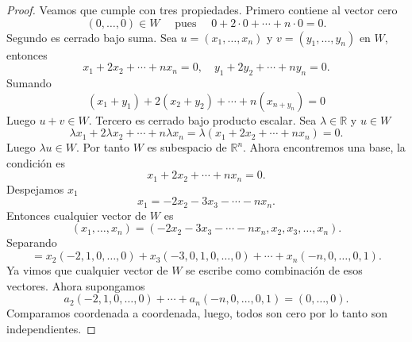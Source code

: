\documentclass[12pt,a4paper]{article}
\begin{document}
    \begin{proof}
        Veamos que cumple con tres propiedades. Primero contiene al vector cero
        \begin{equation*}
            (0,\dots,0)\in W\quad\text{ pues }\quad0+2\cdot0+\cdots+n\cdot0=0.
        \end{equation*}
        Segundo es cerrado bajo suma. Sea $u=(x_{1},\dots,x_{n})$ y $v=(y_{1},\dots,y_{n})$
        en $W$, entonces
        \begin{equation*}
            x_{1}+2x_{2}+\cdots+nx_{n}=0,\quad y_{1}+2y_{2}+\cdots+ny_{n}=0.
        \end{equation*}
        Sumando
        \begin{equation*}
            (x_{1}+y_{1})+2(x_{2}+y_{2})+\cdots+n(x_{n+y_{n}})=0
        \end{equation*}
        Luego $u+v\in W$. Tercero es cerrado bajo producto escalar. Sea $\lambda\in\mathbb{R}$
        y $u\in W$
        \begin{equation*}
            \lambda x_{1}+ 2\lambda x_{2}+\cdots+n\lambda x_{n}=\lambda(x_{1}+2x_{2}+\cdots+nx_{n})=0.
        \end{equation*}
        Luego $\lambda u\in W$. Por tanto $W$ es subespacio de $\mathbb{R}^{n}$. Ahora encontremos una base,
        la condición es
        \begin{equation*}
            x_{1}+2x_{2}+\cdots+nx_{n}=0.
        \end{equation*}
        Despejamos $x_{1}$
        \begin{equation*}
            x_{1}=-2x_{2}-3x_{3}-\cdots-nx_{n}.
        \end{equation*}
        Entonces cualquier vector de $W$ es
        \begin{equation*}
            (x_{1},\dots,x_{n})=(-2x_{2}-3x_{3}-\cdots-nx_{n},x_{2},x_{3},\dots,x_{n}).
        \end{equation*}
        Separando
        \begin{equation*}
            =x_{2}(-2,1,0,\dots,0)+x_{3}(-3,0,1,0,\dots,0)+\cdots+x_{n}(-n,0,\dots,0,1).
        \end{equation*}
        Ya vimos que cualquier vector de $W$ se escribe como combinación de esos vectores.
        Ahora supongamos
        \begin{equation*}
            a_{2}(-2,1,0,\dots,0)+\cdots+a_{n}(-n,0,\dots,0,1)=(0,\dots,0).
        \end{equation*}
        Comparamos coordenada a coordenada, luego, todos son cero por lo tanto son independientes.
    \end{proof}
\end{document}
